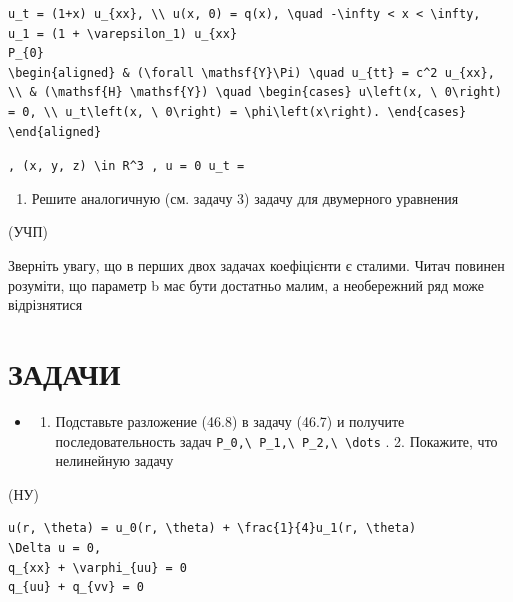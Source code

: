 \documentclass[
  ukrainian,
]{article}
\providecommand{\tightlist}{%
  \setlength{\itemsep}{0pt}\setlength{\parskip}{0pt}}
\begin{document}
\begin{verbatim}
u_t = (1+x) u_{xx}, \\ u(x, 0) = q(x), \quad -\infty < x < \infty,
u_1 = (1 + \varepsilon_1) u_{xx}
P_{0}
\begin{aligned} & (\forall \mathsf{Y}\Pi) \quad u_{tt} = c^2 u_{xx}, \\ & (\mathsf{H} \mathsf{Y}) \quad \begin{cases} u\left(x, \ 0\right) = 0, \\ u_t\left(x, \ 0\right) = \phi\left(x\right). \end{cases} \end{aligned}
\end{verbatim}

\texttt{,\ \textquotesingle{}(x,\ y,\ z)\ \textbackslash{}in\ R\^{}3\textquotesingle{}\ ,\ \textquotesingle{}u\ =\ 0\textquotesingle{}\ u\_t\ =}

\begin{enumerate}
\def\labelenumi{\arabic{enumi}.}
\setcounter{enumi}{3}
\tightlist
\item
  Решите аналогичную (см. задачу 3) задачу для двумерного уравнения
\end{enumerate}

(УЧП)

Зверніть увагу, що в перших двох задачах коефіцієнти є сталими. Читач
повинен розуміти, що параметр b має бути достатньо малим, а необережний
ряд може відрізнятися

\section{ЗАДАЧИ}\label{ux437ux430ux434ux430ux447ux438-4}

\begin{itemize}
\tightlist
\item
  \begin{enumerate}
  \def\labelenumi{\arabic{enumi}.}
  \tightlist
  \item
    Подставьте разложение (46.8) в задачу (46.7) и получите
    последовательность задач
    \texttt{P\_0,\textbackslash{}\ P\_1,\textbackslash{}\ P\_2,\textbackslash{}\ \textbackslash{}dots}
    . 2. Покажите, что нелинейную задачу
  \end{enumerate}
\end{itemize}

(НУ)

\begin{verbatim}
u(r, \theta) = u_0(r, \theta) + \frac{1}{4}u_1(r, \theta)
\Delta u = 0,
q_{xx} + \varphi_{uu} = 0
q_{uu} + q_{vv} = 0
\end{verbatim}
\end{document}
